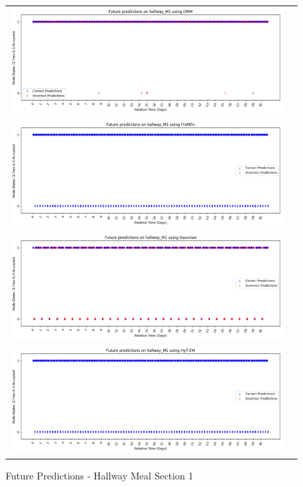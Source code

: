 \begin{figure}[!Hp]
  \begin{tabular}{cc}
    {\includegraphics[width = 6in]{images/results/Future_hallway_M1_DMM.png}} \\
    {\includegraphics[width = 6in]{images/results/Future_hallway_M1_FreMEn.png}} \\
    {\includegraphics[width = 6in]{images/results/Future_hallway_M1_Gaussian.png}} \\
    {\includegraphics[width = 6in]{images/results/Future_hallway_M1_HyT-EM.png}} \\
  \end{tabular}
  \caption{Future Predictions - Hallway Meal Section 1}
\end{figure}

